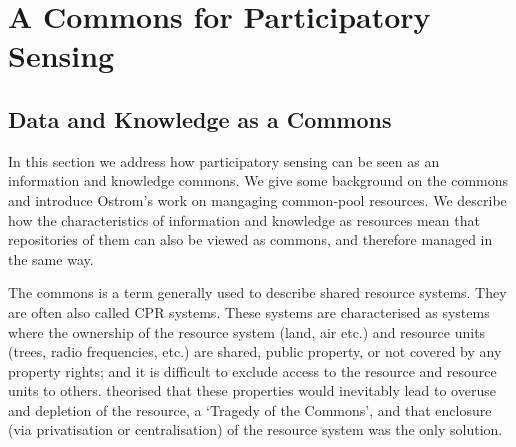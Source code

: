 

%

\acresetall
\chapter{A Commons for Participatory Sensing}\label{sec:iad}

\section{Data and Knowledge as a Commons}\label{sec:commons}

In this section we address how participatory sensing can be seen as an information and knowledge commons. 
We give some background on the commons and introduce Ostrom's work on mangaging common-pool resources. 
We describe how the characteristics of information and knowledge as resources mean that repositories of them can also be viewed as commons, and therefore managed in the same way. %

The commons is a term generally used to describe shared resource systems. They are often also called \ac{CPR} systems. These systems are characterised as systems where the ownership of the resource system (land, air etc.) and resource units (trees, radio frequencies, etc.) are shared, public property, or not covered by any property rights; and it is difficult to exclude access to the resource and resource units to others. 
\citet{Hardin1968} theorised that these properties would inevitably lead to overuse and depletion of the resource, a `Tragedy of the Commons', and that enclosure (via privatisation or centralisation) of the resource system was the only solution.

